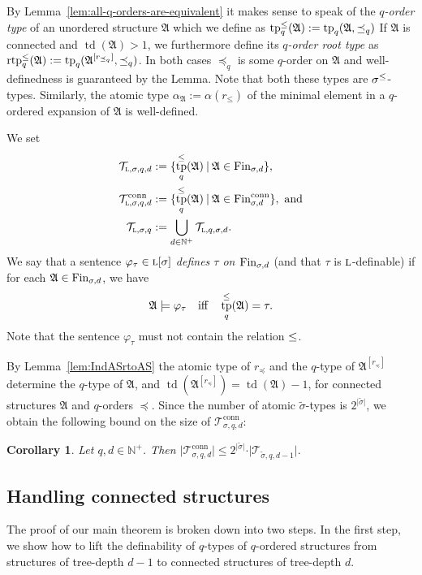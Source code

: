 \documentclass[11pt]{article}
\newtheorem{corollary}[theorem]{Corollary}
\renewcommand{\phi}{\varphi}
\newcommand{\fin}{\textup{Fin}}
\newcommand{\conn}{\text{conn}}
\newcommand{\logic}[1]{\textsc{#1}}
\newcommand{\logl}{\logic{l}}
\newcommand{\types}[1][\sigma,q,d]{\mathcal{T}_{#1}}
\newcommand{\ctypes}[1][\sigma,q,d]{\mathcal{T}^{\conn}_{#1}}
\newcommand{\st}{\mathbin |}
\newcommand{\leqsym}{\logic{\ensuremath{\leq}}}
\DeclareMathOperator{\tp}{tp}
\DeclareMathOperator{\rtp}{rtp}
\newcommand{\struct}[1]{\mathfrak{#1}}
\newcommand{\AS}{\struct{A}}
\newcommand{\td}{\operatorname{td}}
\newcommand{\Npos}{\mathbb{N}^{+}}
\begin{document}
By Lemma~\ref{lem:all-q-orders-are-equivalent} it makes sense to speak
of the \emph{$q$-order type} of an unordered structure $\AS$ which we
define as $\tp^\leqsym_q(\AS) := \tp_q(\AS,\preceq_q)$
If $\AS$ is connected and $\td(\AS) > 1$, we furthermore define its
\emph{$q$-order root type} as $\rtp^\leqsym_q(\AS) :=
\tp_q(\AS^{[r_{\preceq_q}]},\preceq_q)$. 
In both cases $\preceq_q$ is some $q$-order on $\AS$ and
well-definedness is guaranteed by the Lemma. Note that both these
types are $\sigma^{\leqsym}$-types. Similarly, the atomic type $\alpha_\AS :=
\alpha(r_\leq)$ of the minimal element in a $q$-ordered expansion of $\AS$ is 
well-defined.

We set
\[\begin{split}
\types[\logl,\sigma,q,d] &:= \{ \tp^\leqsym_q(\AS) \st \AS \in
\fin_{\sigma,d} \},
\\
\ctypes[\logl,\sigma,q,d] &:= \{ \tp^\leqsym_q(\AS) \st \AS \in
\fin^\conn_{\sigma,d} \},\text{ and}
\\
\types[\logl,\sigma,q] &:= \bigcup_{d \in \Npos}
\types[\logl,q,\sigma,d].
\end{split}
\]
We say that a sentence $\phi_{\tau} \in \logl[\sigma]$ \emph{defines
  $\tau$ on $\fin_{\sigma,d}$} (and that $\tau$ is $\logl$-definable)
if for each $\AS\in\fin_{\sigma,d}$, we have
\[
\AS\models \phi_{\tau}
\quad\text{iff}\quad
\tp^\leqsym_{q}(\AS)=\tau.
\]
Note that the sentence $\phi_\tau$ must not contain the relation
$\leqsym$.

By Lemma~\ref{lem:IndASrtoAS} the atomic type of $r_\preceq$ and the
$q$-type of $\AS^{[r_\preceq]}$ determine the $q$-type of $\AS$, and
$\td(\AS^{[r_{\preceq}]}) = \td(\AS) - 1$, 
for connected structures $\AS$ and $q$-orders $\preceq$. Since the
number of atomic $\tilde \sigma$-types is $2^{\vert{\tilde
    \sigma}\vert}$, we obtain the following bound on the size of
$\ctypes[\sigma,q,d]$:

\begin{corollary}
  \label{cor:num-connected-types}
  Let $q,d \in \Npos$. Then $\vert\ctypes[\sigma, q,d]\vert \leq
  2^{\vert{\tilde \sigma}\vert} \cdot \vert{\types[\tilde \sigma,
    q,d-1]}\vert.$
\end{corollary}

\subsection{Handling connected structures}

The proof of our main theorem is broken down into two steps. In the first step,
we show how to lift the definability of $q$-types of $q$-ordered structures from
structures of tree-depth $d-1$ to connected structures of tree-depth $d$.
\end{document}
